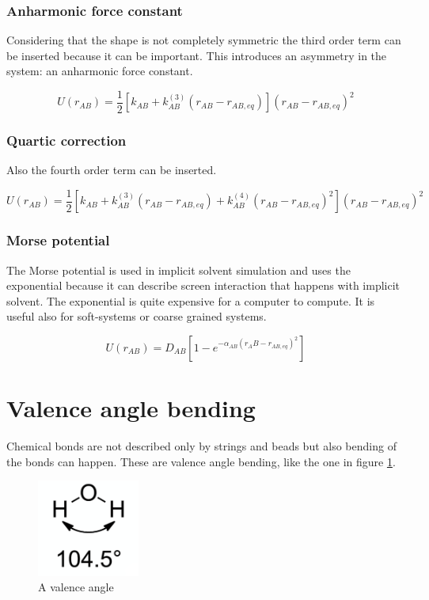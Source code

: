 		\subsubsection{Anharmonic force constant}
		Considering that the shape is not completely symmetric the third order term can be inserted because it can be important.
		This introduces an asymmetry in the system: an anharmonic force constant.

		$$U(r_{AB}) = \frac{1}{2}[k_{AB}+k^{(3)}_{AB}(r_{AB}-r_{AB, eq})](r_{AB}-r_{AB, eq})^2$$

		\subsubsection{Quartic correction}
		Also the fourth order term can be inserted.

		$$U(r_{AB}) = \frac{1}{2}[k_{AB}+k^{(3)}_{AB}(r_{AB}-r_{AB, eq}) + k^{(4)}_{AB}(r_{AB}-r_{AB,eq})^2](r_{AB}-r_{AB, eq})^2$$

		\subsubsection{Morse potential}
		The Morse potential is used in implicit solvent simulation and uses the exponential because it can describe screen interaction that happens with implicit solvent.
		The exponential is quite expensive for a computer to compute.
		It is useful also for soft-systems or coarse grained systems.

		$$U(r_{AB}) = D_{AB}[1-e^{-\alpha_{AB}(r_AB-r_{AB,eq})^2}]$$

\section{Valence angle bending}
Chemical bonds are not described only by strings and beads but also bending of the bonds can happen.
These are valence angle bending, like the one in figure \ref{fig:valence-angle-bending}.

\begin{figure}[H]
	\centering
	\includegraphics[width=0.3\textwidth]{valence-angle-bending}
	\caption{A valence angle}
	\label{fig:valence-angle-bending}
\end{figure}

